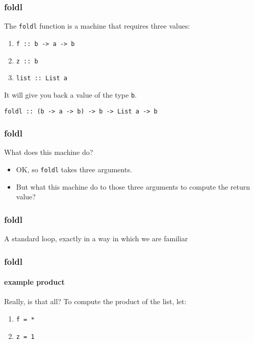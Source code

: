 \begin{frame}
\frametitle{foldl}

The \lstinline[basicstyle=\ttfamily]$foldl$ function is a machine that requires three values:
\begin{enumerate}
\item \lstinline[basicstyle=\ttfamily]$f :: b -> a -> b$
\item \lstinline[basicstyle=\ttfamily]$z :: b$
\item \lstinline[basicstyle=\ttfamily]$list :: List a$
\end{enumerate}

It will give you back a value of the type \lstinline[basicstyle=\ttfamily]$b$.

\hrulefill

\lstinline[basicstyle=\ttfamily]$foldl :: (b -> a -> b) -> b -> List a -> b$

\end{frame}


\begin{frame}
\frametitle{foldl}

\begin{block}{What does this machine do?}

\begin{itemize}
\item OK, so \lstinline[basicstyle=\ttfamily]$foldl$ takes three arguments.
\item But what this machine do to those three arguments to compute the return value?
\end{itemize}


\end{block}

\end{frame}


\begin{frame}
\frametitle{foldl}

\begin{block}{A standard loop, exactly in a way in which we are familiar}

\end{block}

\end{frame}


\begin{frame}
\frametitle{foldl}
\framesubtitle{example \textemdash product}

\begin{block}{Really, is that all?}
To compute the product of the list, let:
\begin{enumerate}
\item \lstinline[basicstyle=\ttfamily]$f = *$
\item \lstinline[basicstyle=\ttfamily]$z = 1$
\end{enumerate}
\end{block}

\end{frame}


